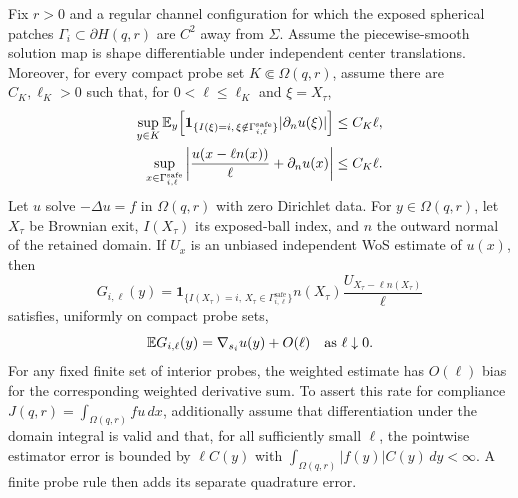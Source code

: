 \begin{proposition}
\label{prop:channel-diffwos}
Fix $r>0$ and a regular channel configuration for which the exposed spherical
patches $\Gamma_i\subset\partial H(q,r)$ are $C^2$ away from $\Sigma$.
Assume the piecewise-smooth solution map is shape differentiable under
independent center translations.  Moreover, for every compact probe set
$K\Subset\Omega(q,r)$, assume there are $C_K,\ell_K>0$ such that, for
$0<\ell\le\ell_K$ and $\xi=X_\tau$,
\begin{align}
 \sup_{y\in K}\mathbb{E}_y\!\left[
  \mathbf 1_{\{I(\xi)=i,\,\xi\notin\Gamma_{i,\ell}^{\mathrm{safe}}\}}
  |\partial_nu(\xi)|\right]&\le C_K\ell,
 \label{eq:weightedseamstrip}\\
 \sup_{x\in\Gamma_{i,\ell}^{\mathrm{safe}}}
 \left|\frac{u(x-\ell n(x))}{\ell}+\partial_nu(x)\right|
 &\le C_K\ell.
 \label{eq:safenormaltaylor}
\end{align}
Let $u$ solve
$-\Delta u=f$ in $\Omega(q,r)$ with
zero Dirichlet data.  For $y\in\Omega(q,r)$, let $X_\tau$ be Brownian exit,
$I(X_\tau)$ its exposed-ball index, and $n$ the outward normal of the retained
domain.  If $U_x$ is an unbiased independent WoS estimate of $u(x)$, then
\begin{equation}
 G_{i,\ell}(y)=
 \mathbf 1_{\{I(X_\tau)=i,\,
 X_\tau\in\Gamma_{i,\ell}^{\mathrm{safe}}\}}
 n(X_\tau)\frac{U_{X_\tau-\ell n(X_\tau)}}{\ell}
 \label{eq:diffwoscenterestimator}
\end{equation}
satisfies, uniformly on compact probe sets,
\begin{equation}
 \mathbb{E} G_{i,\ell}(y)=\nabla_{s_i}u(y)+O(\ell)
 \quad\text{as }\ell\downarrow0.
 \label{eq:diffwoscenterbias}
\end{equation}
For any fixed finite set of interior probes, the weighted estimate has $O(\ell)$ bias for the corresponding weighted derivative sum. To assert this rate for compliance $J(q,r)=\int_{\Omega(q,r)}fu\,dx$, additionally assume that differentiation under the domain integral is valid and that, for all sufficiently small $\ell$, the pointwise estimator error is bounded by $\ell C(y)$ with $\int_{\Omega(q,r)}|f(y)|C(y)\,dy<\infty$. A finite probe rule then adds its separate quadrature error.
\end{proposition}

